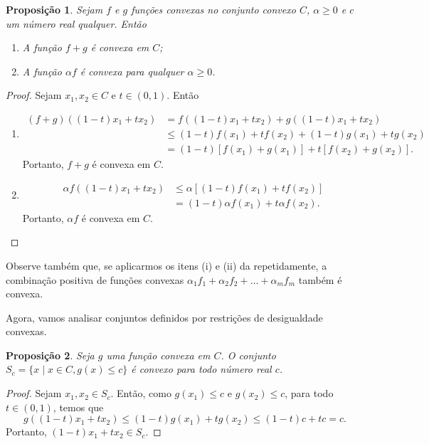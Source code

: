 \documentclass[12pt,a4paper]{scrartcl}
\newtheorem{prop}{Proposição}
\theoremstyle{definition}%
\begin{document}
\begin{prop} \label{prop:combinacao_funcoes_convexa}
Sejam $f$ e $g$ funções convexas no conjunto convexo $C$, $\alpha \geq 0$ e $c$ um número real qualquer. Então
\begin{enumerate}
	\item[(i)] A função $f+g$ é convexa em $C$;
	\item[(ii)] A função $\alpha f$ é convexa para qualquer $\alpha \geq 0$.
\end{enumerate}
\end{prop}
\begin{proof}
Sejam $x_{1}, x_{2} \in C$ e $t\in (0,1)$. Então
\begin{enumerate}
\item[(i)] 
\[
\begin{aligned}
(f+g)((1-t)x_{1} + tx_{2}) &= f((1-t)x_{1} + tx_{2}) + g((1-t)x_{1} + tx_{2}) \\
&\leq (1-t)f(x_{1}) + tf(x_{2}) + (1-t)g(x_{1}) + tg(x_{2}) \\
&= (1-t)[f(x_{1}) + g(x_{1})] + t[f(x_{2}) + g(x_{2})] .
\end{aligned}
\]
Portanto, $f+g$ é convexa em $C$.
\item[(ii)] 
\[
\begin{aligned}
\alpha f((1-t)x_{1} + tx_{2}) &\leq \alpha [(1-t)f(x_{1}) + tf(x_{2})] \\
&= (1-t)\alpha f(x_{1}) + t\alpha f(x_{2}) .
\end{aligned}
\]
Portanto, $\alpha f$ é convexa em $C$.
\end{enumerate}	
\end{proof}

Observe também que, se aplicarmos os itens (i) e (ii) da  repetidamente, a combinação positiva de funções convexas $\alpha_{1} f_{1} +\alpha_{2} f_{2} + \ldots +\alpha_{m} f_{m}$ também é convexa. 

Agora, vamos analisar conjuntos definidos por restrições de desigualdade convexas.

\begin{prop}
Seja $g$ uma função convexa em $C$. O conjunto $S_{c} = \{ x \mid x\in C, g(x)\leq c \}$ é convexo para todo número real $c$.
\end{prop}
\begin{proof}
Sejam $x_{1}, x_{2} \in S_{c}$. Então, como $g(x_1) \leq c$ e $g(x_2) \leq c$, para todo $t\in (0,1)$, temos que
\[
g((1-t)x_{1} + tx_{2}) \leq (1-t)g(x_{1}) + tg(x_{2}) \leq (1-t)c + tc = c.
\]
Portanto, $(1-t)x_{1} + tx_{2} \in S_{c}$.
\end{proof}
\end{document}
